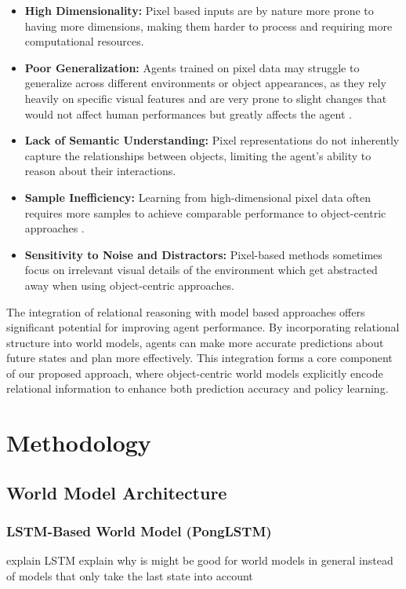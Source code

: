 \documentclass[
	english,
	ruledheaders=section,
	class=report,
	thesis={type=master},
	accentcolor=9c,
	custommargins=true,
	marginpar=false,
	parskip=half-,
	fontsize=11pt,
]{tudapub}
\begin{document}
\begin{itemize}
	\item \textbf{High Dimensionality:} Pixel based inputs are by nature more prone to having more dimensions, making them harder to process and requiring more computational resources.
	\item \textbf{Poor Generalization:} Agents trained on pixel data may struggle to generalize across different environments or object appearances, as they rely heavily on specific visual features and are very prone to slight changes that would not affect human performances but greatly affects the agent \cite{zhang2020learning,stone2021distracting}.
	\item \textbf{Lack of Semantic Understanding:} Pixel representations do not inherently capture the relationships between objects, limiting the agent's ability to reason about their interactions.
	\item \textbf{Sample Inefficiency:} Learning from high-dimensional pixel data often requires more samples to achieve comparable performance to object-centric approaches \cite{watters2019cobra}.
	\item \textbf{Sensitivity to Noise and Distractors:} Pixel-based methods sometimes focus on irrelevant visual details of the environment which get abstracted away when using object-centric approaches.
\end{itemize}


The integration of relational reasoning with model based approaches offers
significant potential for improving agent performance. By incorporating
relational structure into world models, agents can make more accurate
predictions about future states and plan more effectively. This integration
forms a core component of our proposed approach, where object-centric world
models explicitly encode relational information to enhance both prediction
accuracy and policy learning.

\chapter{Methodology}
\label{chap:methodology}

\section{World Model Architecture}
\label{sec:world_model_arch}

\subsection{LSTM-Based World Model (PongLSTM)}
\label{subsec:ponglstm}
explain LSTM
explain why is might be good for world models in general instead of models that only take the last state into account
\end{document}

